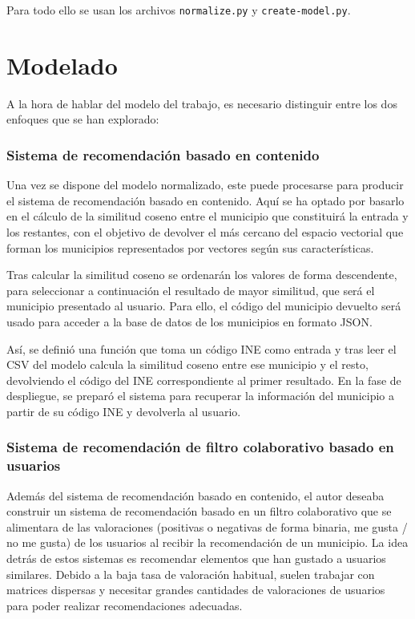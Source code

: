 Para todo ello se usan los archivos \texttt{normalize.py} y \texttt{create-model.py}.

\section{Modelado}

A la hora de hablar del modelo del trabajo, es necesario distinguir entre los dos enfoques que se han explorado:

\subsubsection{Sistema de recomendación basado en contenido}

Una vez se dispone del modelo normalizado, este puede procesarse para producir el sistema de recomendación basado en contenido. Aquí se ha optado por basarlo en el cálculo de la similitud coseno entre el municipio que constituirá la entrada y los restantes, con el objetivo de devolver el más cercano del espacio vectorial que forman los municipios representados por vectores según sus características.

Tras calcular la similitud coseno se ordenarán los valores de forma descendente, para seleccionar a continuación el resultado de mayor similitud, que será el municipio presentado al usuario. Para ello, el código del municipio devuelto será usado para acceder a la base de datos de los municipios en formato JSON.


Así, se definió una función que toma un código INE como entrada y tras leer el CSV del modelo calcula la similitud coseno entre ese municipio y el resto, devolviendo el código del INE correspondiente al primer resultado. En la fase de despliegue, se preparó el sistema para recuperar la información del municipio a partir de su código INE y devolverla al usuario.

\subsubsection{Sistema de recomendación de filtro colaborativo basado en usuarios}

Además del sistema de recomendación basado en contenido, el autor deseaba construir un sistema de recomendación basado en un filtro colaborativo que se alimentara de las valoraciones (positivas o negativas de forma binaria, \guillemotleft me gusta / no me gusta\guillemotright\space) de los usuarios al recibir la recomendación de un municipio. La idea detrás de estos sistemas es recomendar elementos que han gustado a usuarios similares. Debido a la baja tasa de valoración habitual, suelen trabajar con matrices dispersas y necesitar grandes cantidades de valoraciones de usuarios para poder realizar recomendaciones adecuadas.

